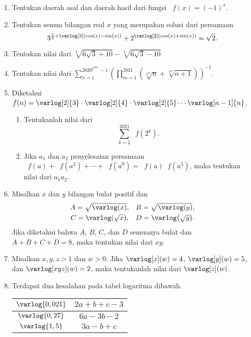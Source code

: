 \documentclass[12pt]{article}
\newcommand*\func[2]{\mathop{}\!{#1}{\left({#2}\right)}}
\let\log\varlog
\begin{document}
\begin{enumerate}[leftmargin=*]
		\item Tentukan daerah asal dan daerah hasil dari fungsi $ \func{f}{x} = \left(-1\right)^{x} $.
		\item Tentukan semua bilangan real $ x $ yang merupakan solusi dari persamaan
		\[ 3^{\frac{1}{2} + \func{\log[3]}{\func{\cos}{x} - \func{\sin}{x}}} + 2^{\func{\log[2]}{\func{\cos}{x} + \func{\sin}{x}}} = \sqrt{2}. \]
		\item Tentukan nilai dari $ \sqrt[3]{6\sqrt{3} + 10} - \sqrt[3]{6\sqrt{3} - 10} $.
		\item Tentukan nilai dari $ \displaystyle{\sum_{n = 1}^{2020^{2^{2021}} - 1}{\left(\prod_{m = 1}^{2021}{\left(\sqrt[2^{m}]{n} + \sqrt[2^{m}]{n + 1}\right)}\right)^{-1}}} $.
		\item Diketahui $ \func{f}{n} = \log[2]{3} \cdot \log[2]{4} \cdot \log[2]{5} \cdots \log[n - 1]{n} $.
		\begin{enumerate}
			\item Tentukanlah nilai dari
			\[ \sum_{k = 2}^{2021}{\func{f}{2^{k}}}. \]
			\item Jika $ a_{1} $ dan $ a_{2} $ penyelesaian persamaan $ \func{f}{a} + \func{f}{a^{2}} + \cdots + \func{f}{a^{9}} = \func{f}{a}\func{f}{a^{5}} $, maka tentukan nilai dari $ a_{1}a_{2} $.
		\end{enumerate}
		\item Misalkan $ x $ dan $ y $ bilangan bulat positif dan
		\[
			\begin{matrix}
				A = \sqrt{\func{\log}{x}}, & B = \sqrt{\func{\log}{y}}, \\[3pt]
				C = \func{\log}{\sqrt{x}}, & D = \func{\log}{\sqrt{y}}.
			\end{matrix}
		\]
		Jika diketahui bahwa $ A $, $ B $, $ C $, dan $ D $ semuanya bulat dan $ A + B + C + D = 8 $, maka tentukan nilai dari $ xy $.
		\item Misalkan $ x, y, z > 1 $ dan $ w > 0 $. Jika $ \func{\log[x]}{w} = 4 $, $ \func{\log[y]}{w} = 5 $, dan $ \func{\log[xyz]}{w} = 2 $, maka tentukanlah nilai dari $ \func{\log[z]}{w} $.
		\item Terdapat dua kesalahan pada tabel logaritma dibawah.
		\begin{center}
			\begin{tabular}{|c|c|}
				\hline
				$ \log{0,021} $ & $ 2a + b + c - 3 $ \\
				\hline
				$ \log{0,27} $ & $ 6a - 3b - 2 $ \\
				\hline
				$ \log{1,5} $ & $ 3a - b + c $ \\

\end{tabular}
\end{center}
\end{enumerate}
\end{document}
